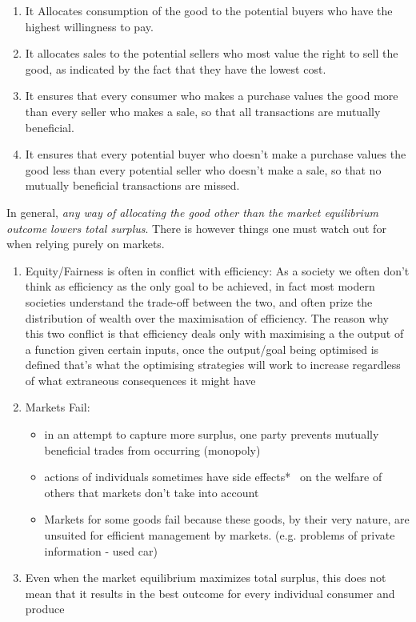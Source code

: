 \documentclass[english,course]{Notes}
\newcommand{\ita}[1]{\textit{#1}}
\begin{document}
\begin{enumerate}
	\item It Allocates consumption of the good to the potential buyers who have the highest willingness to pay.
	
	\item  It allocates sales to the potential sellers who most value the right to sell the good, as indicated by the fact that they have the lowest cost.
	
	\item It ensures that every consumer who makes a purchase values the good more than every seller who makes a sale, so that all transactions are mutually beneficial.
	
	\item It ensures that every potential buyer who doesn't make a purchase values the good less than every potential seller who doesn't make a sale, so that no mutually beneficial transactions are missed.
\end{enumerate}

\par{In general, \ita{any way of allocating the good other than the market equilibrium outcome lowers total surplus}. There is however things one must watch out for when relying purely on markets.}

\begin{enumerate}
	\item Equity/Fairness is often in conflict with efficiency: As a society we often don't think as efficiency as the only goal to be achieved, in fact most modern societies understand the trade-off between the two, and often prize the distribution of wealth over the maximisation of efficiency. The reason why this two conflict is that efficiency deals only with maximising a the output of a function given certain inputs, once the output/goal being optimised is defined that's what the optimising strategies will work to increase regardless of what extraneous consequences it might have
	
	\item Markets Fail: 
		\begin{itemize}
		\item in an attempt to capture more surplus, one party prevents mutually beneficial trades from occurring (monopoly)
		\item actions of individuals sometimes have side effects*~ on the welfare of others that markets don't take into account
		\item Markets for some goods fail because these goods, by their very nature, are unsuited for efficient management by markets. (e.g. problems of private information - used car)
		\end{itemize}
		
	\item Even when the market equilibrium maximizes total surplus, this does not mean that it results in the best outcome for every individual consumer and produce
\end{enumerate}
\end{document}
